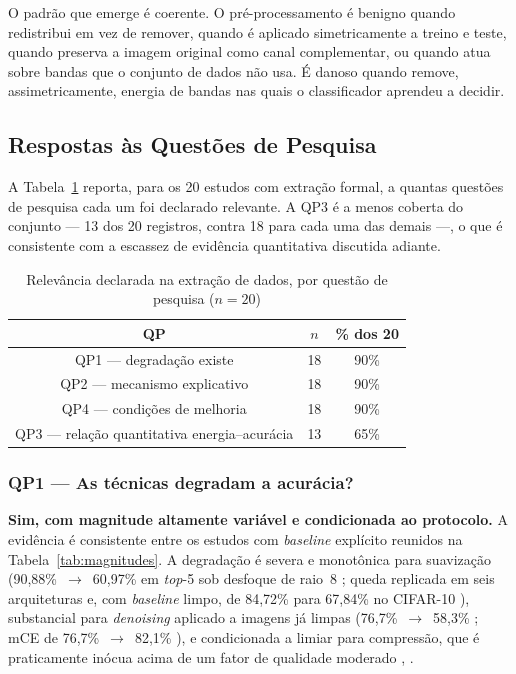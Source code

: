 \documentclass[conference]{IEEEtran}
\begin{document}
O padrão que emerge é coerente. O pré-processamento é benigno
quando redistribui em vez de remover, quando é aplicado simetricamente a treino
e teste, quando preserva a imagem original como canal complementar, ou quando
atua sobre bandas que o conjunto de dados não usa. É danoso quando remove,
assimetricamente, energia de bandas nas quais o classificador aprendeu a
decidir.

\subsection{Respostas às Questões de Pesquisa}
\label{sec:rq}

A Tabela~\ref{tab:mapaqp} reporta, para os 20 estudos com extração formal, a
quantas questões de pesquisa cada um foi declarado relevante. A QP3 é a menos
coberta do conjunto --- 13 dos 20 registros, contra 18 para cada uma das
demais ---, o que é consistente com a escassez de evidência quantitativa
discutida adiante.

\begin{table}[htbp]
\caption{Relevância declarada na extração de dados, por questão de pesquisa ($n=20$)}
\begin{center}
\footnotesize
\begin{tabular}{|c|c|c|}
\hline
\textbf{QP} & \textbf{$n$} & \textbf{\% dos 20} \\
\hline
QP1 --- degradação existe & 18 & 90\% \\
\hline
QP2 --- mecanismo explicativo & 18 & 90\% \\
\hline
QP4 --- condições de melhoria & 18 & 90\% \\
\hline
QP3 --- relação quantitativa energia--acurácia & 13 & 65\% \\
\hline
\end{tabular}
\label{tab:mapaqp}
\end{center}
\end{table}

\subsubsection{QP1 --- As técnicas degradam a acurácia?}

\textbf{Sim, com magnitude altamente variável e condicionada ao protocolo.} A
evidência é consistente entre os estudos com \textit{baseline} explícito
reunidos na Tabela~\ref{tab:magnitudes}. A degradação é severa e monotônica
para suavização (90,88\%~$\rightarrow$~60,97\% em \textit{top}-5 sob desfoque
de raio~8 \cite{b4}; queda replicada em seis arquiteturas \cite{b5} e, com
\textit{baseline} limpo, de 84,72\% para 67,84\% no CIFAR-10 \cite{b28}),
substancial para \textit{denoising} aplicado a imagens já limpas
(76,7\%~$\rightarrow$~58,3\% \cite{b7}; mCE de 76,7\%~$\rightarrow$~82,1\%
\cite{b6}), e condicionada a limiar para compressão, que é praticamente inócua
acima de um fator de qualidade moderado \cite{b1}, \cite{b10}.
\end{document}
